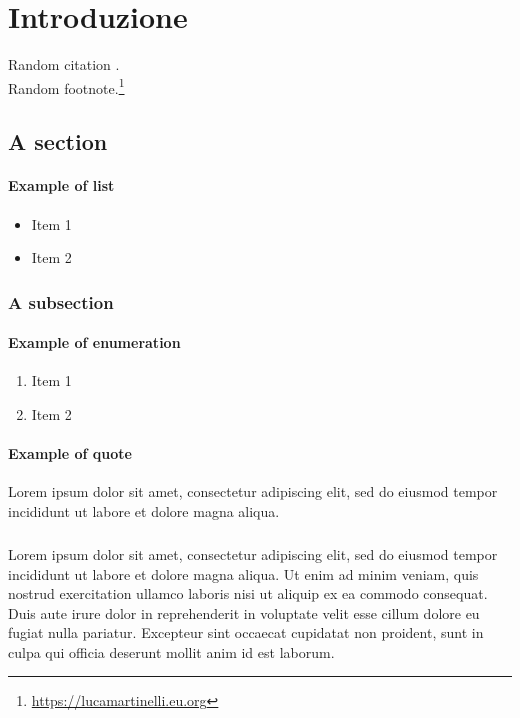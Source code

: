 
\chapter{Introduzione}
\label{chp:intro}



Random citation \cite{alecci2021development}. \\
Random footnote.\footnote{\url{https://lucamartinelli.eu.org}}


\section{A section}

\subsubsection{Example of list}
\begin{itemize}
  \item Item 1
  \item Item 2
\end{itemize}

\subsection{A subsection}



\subsubsection{Example of enumeration}
\begin{enumerate}
  \item Item 1
  \item Item 2
\end{enumerate}

\subsubsection{Example of quote}
\begin{displayquote}
Lorem ipsum dolor sit amet, consectetur adipiscing elit, sed do eiusmod tempor incididunt ut labore et dolore magna aliqua.
\end{displayquote}

\paragraph{}
Lorem ipsum dolor sit amet, consectetur adipiscing elit, sed do eiusmod tempor incididunt ut labore et dolore magna aliqua. Ut enim ad minim veniam, quis nostrud exercitation ullamco laboris nisi ut aliquip ex ea commodo consequat. Duis aute irure dolor in reprehenderit in voluptate velit esse cillum dolore eu fugiat nulla pariatur. Excepteur sint occaecat cupidatat non proident, sunt in culpa qui officia deserunt mollit anim id est laborum.